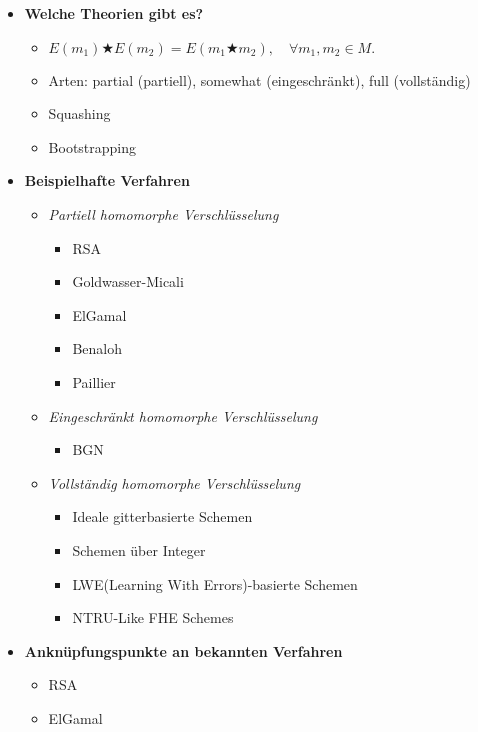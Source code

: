 \label{sec:praxis}
\begin{itemize}
    \item \textbf{Welche Theorien gibt es?}
    \begin{itemize}
    	\item \( E(m_1)\bigstar E(m_2) = E(m_1\bigstar m_2),\quad \forall m_1,m_2\in M. \)
        \item Arten: partial (partiell), somewhat (eingeschränkt), full (vollständig)
        \item Squashing
        \item Bootstrapping
    \end{itemize}


	\item \textbf{Beispielhafte Verfahren}
	\begin{itemize}
		
		\item \textit{Partiell homomorphe Verschlüsselung}
		\begin{itemize}
			\item RSA
			\item Goldwasser-Micali
			\item ElGamal
			\item Benaloh
			\item Paillier
		\end{itemize}
	
		\item \textit{Eingeschränkt homomorphe Verschlüsselung}
		\begin{itemize}
			\item BGN
		\end{itemize}
	
		\item \textit{Vollständig homomorphe Verschlüsselung}
		\begin{itemize}
			\item Ideale gitterbasierte Schemen
			\item Schemen über Integer
			\item LWE(Learning With Errors)-basierte Schemen
			\item NTRU-Like FHE Schemes
		\end{itemize}
	
	\end{itemize}

    \item \textbf{Anknüpfungspunkte an bekannten Verfahren}
    \begin{itemize}
        \item RSA
        \item ElGamal
    \end{itemize}

\end{itemize}
